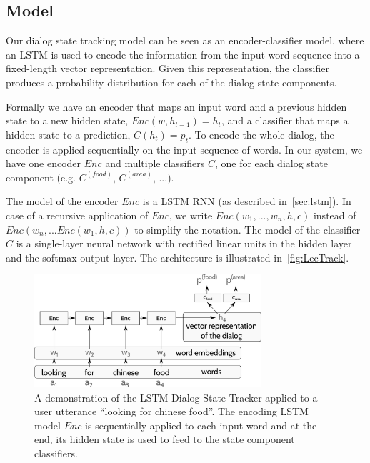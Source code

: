 \documentclass[10pt,twocolumn]{article}
\begin{document}
\subsection{Model}
Our dialog state tracking model can be seen as an encoder-classifier model, where an LSTM is used to encode the information from the input word sequence into a fixed-length vector representation. Given this representation, the classifier produces a probability distribution for each of the dialog state components.

Formally we have an encoder that maps an input word and a previous hidden state to a new hidden state, $Enc(w, h_{t-1})=h_t$, and a classifier that maps a hidden state to a prediction, $C(h_t)=p_t$. To encode the whole dialog, the encoder is applied sequentially on the input sequence of words. In our system, we have one encoder $Enc$ and multiple classifiers $C$, one for each dialog state component (e.g. $C^{(food)}$, $C^{(area)}$, ...).

The model of the encoder $Enc$ is a LSTM RNN (as described in~\autoref{sec:lstm}). In case of a recursive application of $Enc$, we write $Enc(w_1, ..., w_n, h, c)$ instead of $Enc(w_n, ... Enc(w_1, h, c))$ to simplify the notation. The model of the classifier $C$ is a single-layer neural network with rectified linear units in the hidden layer and the softmax output layer. The architecture is illustrated in~\autoref{fig:LecTrack}.

\begin{figure}
\center
\includegraphics[width=0.75\textwidth]{arch}
\caption{A demonstration of the LSTM Dialog State Tracker applied to a user utterance ``looking for chinese food''. The encoding LSTM model $Enc$ is sequentially applied to each input word and at the end, its hidden state is used to feed to the state component classifiers.}
\label{fig:LecTrack}
\end{figure}
\end{document}
